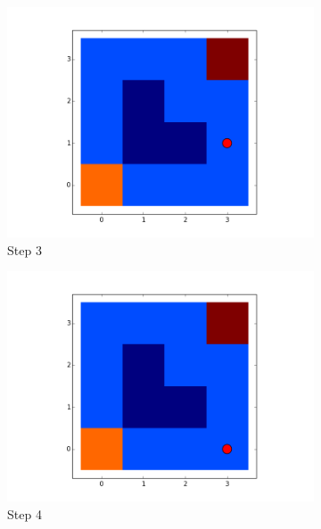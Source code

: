 \documentclass[paper=a4, fontsize=11pt]{scrartcl}
\numberwithin{equation}{section}		%
\numberwithin{figure}{section}			%
\numberwithin{table}{section}		    %
\begin{document}
\begin{figure}[H]
\begin{subfigure}[b]{0.5\textwidth}
			\includegraphics[width=\textwidth]{move_ex_1_step_03}
			\caption{Step 3}
			\label{fig:3}
		\end{subfigure}
		\begin{subfigure}[b]{0.5\textwidth}
			\includegraphics[width=\textwidth]{move_ex_1_step_04}
			\caption{Step 4}
			\label{fig:4}
		\end{subfigure}
		\begin{subfigure}[b]{0.5\textwidth}

\end{subfigure}
\end{figure}
\end{document}
